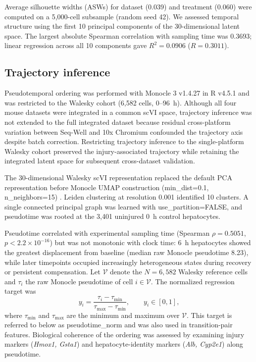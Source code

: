 Average silhouette widths (ASWs) for dataset (0.039) and treatment (0.060) were computed on a 5,000-cell subsample (random seed 42). We assessed temporal structure using the first 10 principal components of the 30-dimensional latent space. The largest absolute Spearman correlation with sampling time was 0.3693; linear regression across all 10 components gave \(R^2 = 0.0906\) (\(R = 0.3011\)).

\subsection*{Trajectory inference}

Pseudotemporal ordering was performed with Monocle 3 v1.4.27 \cite{ref047,ref114,ref115} in R v4.5.1 and was restricted to the Walesky cohort (6,582 cells, 0--96~h). Although all four mouse datasets were integrated in a common scVI space, trajectory inference was not extended to the full integrated dataset because residual cross-platform variation between Seq-Well and 10x Chromium confounded the trajectory axis despite batch correction. Restricting trajectory inference to the single-platform Walesky cohort preserved the injury-associated trajectory while retaining the integrated latent space for subsequent cross-dataset validation.

The 30-dimensional Walesky scVI representation replaced the default PCA representation before Monocle UMAP construction (min\_dist=0.1, n\_neighbors=15) \cite{ref116}. Leiden clustering \cite{ref111} at resolution 0.001 identified 10 clusters. A single connected principal graph was learned with use\_partition=FALSE, and pseudotime was rooted at the 3,401 uninjured 0~h control hepatocytes.

Pseudotime correlated with experimental sampling time (Spearman \(\rho = 0.5051\), \(p < 2.2\times10^{-16}\)) but was not monotonic with clock time: 6~h hepatocytes showed the greatest displacement from baseline (median raw Monocle pseudotime 8.23), while later timepoints occupied increasingly heterogeneous states during recovery or persistent compensation. Let \(\mathcal V\) denote the \(N=6{,}582\) Walesky reference cells and \(\tau_i\) the raw Monocle pseudotime of cell \(i\in\mathcal V\). The normalized regression target was
\begin{equation}\label{eq:pseudotime}
y_i=\frac{\tau_i-\tau_{\min}}{\tau_{\max}-\tau_{\min}},
\qquad y_i\in[0,1],
\end{equation}
where \(\tau_{\min}\) and \(\tau_{\max}\) are the minimum and maximum over \(\mathcal V\). This target is referred to below as pseudotime\_norm and was also used in transition-pair features. Biological coherence of the ordering was assessed by examining injury markers (\textit{Hmox1, Gsta1}) and hepatocyte-identity markers (\textit{Alb, Cyp2e1}) along pseudotime.

